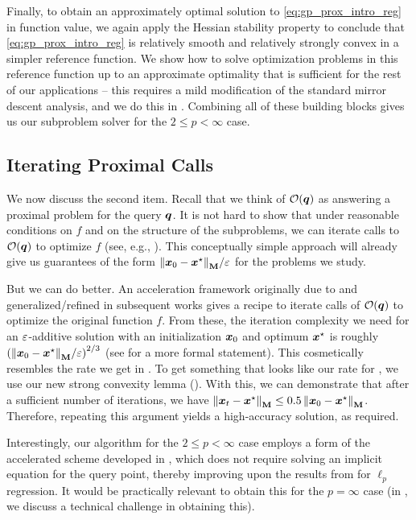 Finally, to obtain an approximately optimal solution to \eqref{eq:gp_prox_intro_reg} in function value, we again apply the Hessian stability property to conclude that \eqref{eq:gp_prox_intro_reg} is relatively smooth and relatively strongly convex in a simpler reference function. We show how to solve optimization problems in this reference function up to an approximate optimality that is sufficient for the rest of our applications -- this requires a mild modification of the standard mirror descent analysis, and we do this in . Combining all of these building blocks gives us our subproblem solver for the $2 \le p < \infty$ case.

\subsection{Iterating Proximal Calls}\label{sec:iter_prox_calls}

We now discuss the second item. Recall that we think of $\mathcal{O}(\bm{q})$ as answering a proximal problem for the query $\bm{q}$. It is not hard to show that under reasonable conditions on $f$ and on the structure of the subproblems, we can iterate calls to $\mathcal{O}(\bm{q})$ to optimize $f$ (see, e.g., \cite[Appendix A]{msbacon}). This conceptually simple approach will already give us guarantees of the form ${\left\lVert \bm{x}_0-\bm{x}^{\star} \right\rVert_{\mathbf{M}}}/{\varepsilon}$ for the problems we study.

But we can do better. An acceleration framework originally due to \citet{ms13} and generalized/refined in subsequent works \citep{bjlls19,msbacon,chjjs22} gives a recipe to iterate calls of $\mathcal{O}(\bm{q})$ to optimize the original function $f$. From these, the iteration complexity we need for an $\varepsilon$-additive solution with an initialization $\bm{x}_0$ and optimum $\bm{x}^{\star}$ is roughly $\left({\left\lVert \bm{x}_0-\bm{x}^{\star} \right\rVert_{\mathbf{M}}}/{\varepsilon}\right)^{2/3}$ (see  for a more formal statement). This cosmetically resembles the rate we get in . To get something that looks like our rate for , we use our new strong convexity lemma  (). With this, we can demonstrate that after a sufficient number of iterations, we have $\left\lVert \bm{x}_t-\bm{x}^{\star} \right\rVert_{\mathbf{M}} \le 0.5\left\lVert \bm{x}_0-\bm{x}^{\star} \right\rVert_{\mathbf{M}}$. Therefore, repeating this argument yields a high-accuracy solution, as required. 

Interestingly, our algorithm for the $2 \le p < \infty$ case employs a form of the accelerated scheme developed in \cite{chjjs22}, which does not require solving an implicit equation for the query point, thereby improving upon the results from \cite{jls21} for $\ell_p$ regression. It would be practically relevant to obtain this for the $p=\infty$ case (in , we discuss a technical challenge in obtaining this).

